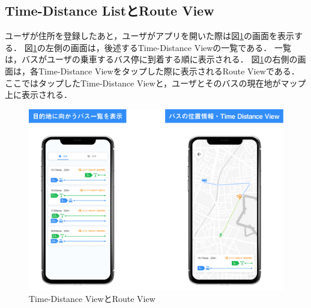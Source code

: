 \subsection{Time-Distance ListとRoute View}
ユーザが住所を登録したあと，ユーザがアプリを開いた際は図\ref{fig:feature_td}の画面を表示する．
図\ref{fig:feature_td}の左側の画面は，後述するTime-Distance Viewの一覧である．
一覧は，バスがユーザの乗車するバス停に到着する順に表示される．
図\ref{fig:feature_td}の右側の画面は，各Time-Distance Viewをタップした際に表示されるRoute Viewである．
ここではタップしたTime-Distance Viewと，ユーザとそのバスの現在地がマップ上に表示される．
\begin{figure}[H]
    \centering
    \includegraphics[width=14cm]{images/feature_td.png}
    \caption{Time-Distance ViewとRoute View}
    \label{fig:feature_td}
\end{figure}
